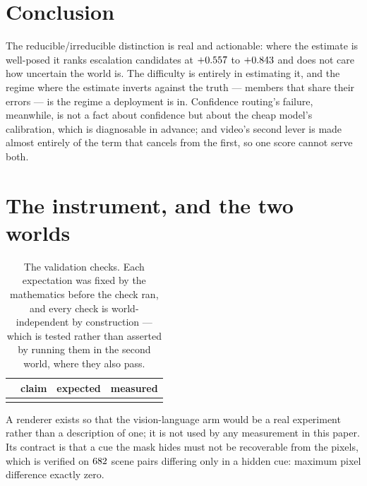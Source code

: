 \documentclass[10pt]{article}
\begin{document}
\section{Conclusion}

The reducible/irreducible distinction is real and actionable: where the estimate is well-posed it
ranks escalation candidates at $+0.557$ to $+0.843$ and does not care how uncertain the
world is. The difficulty is entirely in estimating it, and the regime where the estimate inverts
against the truth --- members that share their errors --- is the regime a deployment is in.
Confidence routing's failure, meanwhile, is not a fact about confidence but about the cheap model's
calibration, which is diagnosable in advance; and video's second lever is made almost entirely of
the term that cancels from the first, so one score cannot serve both.

\small



\normalsize
\appendix
\newpage

\section{The instrument, and the two worlds}
\label{app:instrument}



\begin{table}[h]
\centering
\small
\caption{The validation checks. Each expectation was fixed by the mathematics before the check
ran, and every check is world-independent by construction --- which is tested rather than asserted
by running them in the second world, where they also pass.}
\label{tab:validation}
\begin{tabular}{@{}lp{}p{}p{}@{}}
\toprule
& claim & expected & measured \\
\midrule
 \\
\bottomrule
\end{tabular}
\end{table}

A renderer exists so that the vision-language arm would be a real experiment rather than a
description of one; it is not used by any measurement in this paper. Its contract is that a cue the
mask hides must not be recoverable from the pixels, which is verified on $682$ scene pairs
differing only in a hidden cue: maximum pixel difference exactly zero.
\end{document}
